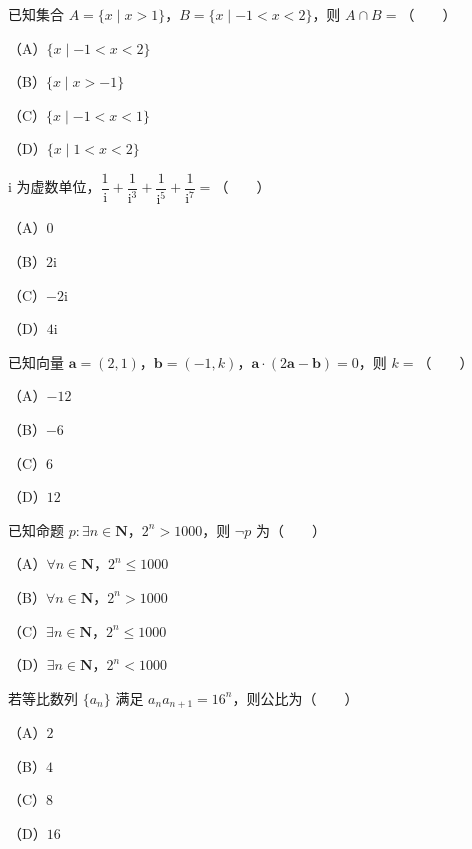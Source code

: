 

\begin{question}
已知集合 $A=\{x\mid x>1\}$，$B=\{x\mid-1<x<2\}$，则 $A\cap B=$\mbox{（　　）}

（A）$\{x\mid-1<x<2\}$

（B）$\{x\mid x>-1\}$

（C）$\{x\mid-1<x<1\}$

（D）$\{x\mid1<x<2\}$

\end{question}
\begin{question}
$\mathrm i$ 为虚数单位，$\dfrac1{\mathrm i}+\dfrac1{\mathrm i^3}+\dfrac1{\mathrm i^5}+\dfrac1{\mathrm i^7}=$\mbox{（　　）}

（A）$0$

（B）$2\mathrm i$

（C）$-2\mathrm i$

（D）$4\mathrm i$

\end{question}
\begin{question}
已知向量 $\boldsymbol a=(2,1)$，$\boldsymbol b=(-1,k)$，$\boldsymbol a\cdot(2\boldsymbol a-\boldsymbol b)=0$，则 $k=$\mbox{（　　）}

（A）$-12$

（B）$-6$

（C）$6$

（D）$12$

\end{question}
\begin{question}
已知命题 $p:\exists n\in\mathbf N$，$2^n>1000$，则 $\neg p$ 为\mbox{（　　）}

（A）$\forall n\in\mathbf N$，$2^n\leqslant1000$

（B）$\forall n\in\mathbf N$，$2^n>1000$

（C）$\exists n\in\mathbf N$，$2^n\leqslant1000$

（D）$\exists n\in\mathbf N$，$2^n<1000$

\end{question}
\begin{question}
若等比数列 $\{a_n\}$ 满足 $a_na_{n+1}=16^n$，则公比为\mbox{（　　）}

（A）$2$

（B）$4$

（C）$8$

（D）$16$

\end{question}
